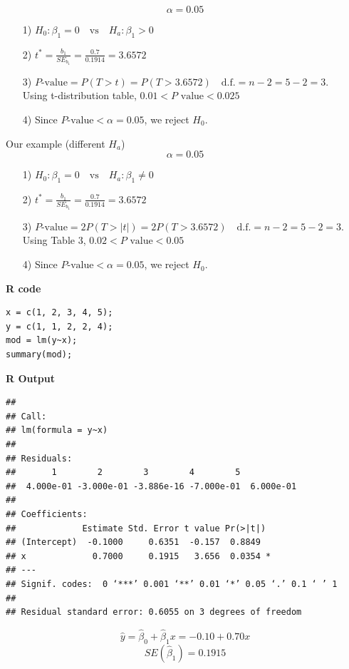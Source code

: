 \begin{example}[continued]
\[
\alpha = 0.05
\]
\begin{enumerate}
    \item[1)]  $H_0: \beta_1 = 0 \quad \text{vs} \quad H_a: \beta_1 > 0$
    \item[2)] $t^* = \frac{b_1}{SE_{b_1}} = \frac{0.7}{0.1914} = 3.6572$
    \item[3)] $P\text{-value} = P(T > t) = P(T > 3.6572) \quad \text{d.f.} = n - 2 = 5 - 2 = 3.$\\
    Using t-distribution table, $0.01 < P\text{ value} < 0.025$
    \item[4)] Since $P\text{-value} < \alpha = 0.05$, we reject $H_0$.
\end{enumerate}

Our example (different $H_a$)
\[
\alpha = 0.05
\]
\begin{enumerate}
    \item[1)] $H_0: \beta_1 = 0 \quad \text{vs} \quad H_a: \beta_1 \neq 0$
    \item[2)] $t^* = \frac{b_1}{SE_{b_1}} = \frac{0.7}{0.1914} = 3.6572$
    \item[3)] $P\text{-value} = 2P(T > |t|) = 2P(T > 3.6572) \quad \text{d.f.} = n - 2 = 5 - 2 = 3.$\\
    Using Table 3, $0.02 < P\text{ value} < 0.05$
    \item[4)] Since $P\text{-value} < \alpha = 0.05$, we reject $H_0$.
\end{enumerate}
\vspace{1em}
\noindent\textbf{R code}

\begin{tcolorbox}[colback=gray!10, colframe=black!45, arc=2mm]
\begin{verbatim}
x = c(1, 2, 3, 4, 5);
y = c(1, 1, 2, 2, 4);
mod = lm(y~x);
summary(mod);
\end{verbatim}
\end{tcolorbox}
\noindent\textbf{R Output}

\begin{tcolorbox}[colback=gray!10, colframe=black!45, arc=2mm]
\begin{verbatim}
## 
## Call:
## lm(formula = y~x)
## 
## Residuals:
##       1        2        3        4        5 
##  4.000e-01 -3.000e-01 -3.886e-16 -7.000e-01  6.000e-01 
## 
## Coefficients:
##             Estimate Std. Error t value Pr(>|t|)   
## (Intercept)  -0.1000     0.6351  -0.157  0.8849    
## x             0.7000     0.1915   3.656  0.0354 *  
## ---
## Signif. codes:  0 ‘***’ 0.001 ‘**’ 0.01 ‘*’ 0.05 ‘.’ 0.1 ‘ ’ 1
## 
## Residual standard error: 0.6055 on 3 degrees of freedom
\end{verbatim}
\end{tcolorbox}
\[
\hat{y} = \hat{\beta}_0 + \hat{\beta}_1 x = -0.10 + 0.70x
\]
\[
SE(\hat{\beta}_1) = 0.1915
\]


\end{example}
